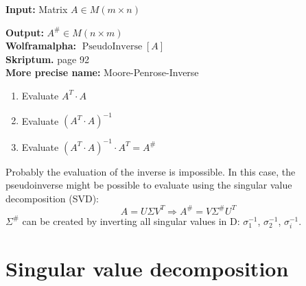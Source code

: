 \documentclass[a4paper,twocolumn]{article}
\newcommand{\io}[2]{{\par\noindent\textbf{Input:} #1 \\}{\textbf{Output:} #2 \\}}
\newcommand{\wa}[1]{\textbf{Wolframalpha:} $#1$ \\}
\newcommand{\scriptref}[1]{\textbf{Skriptum.} page #1 \\}
\begin{document}
\io{Matrix $A \in M(m\times n)$}{$A^{\#} \in M(n\times m)$}
\wa{\operatorname{PseudoInverse}[A]}
\scriptref{92}
\textbf{More precise name:} Moore-Penrose-Inverse

\begin{enumerate}
    \item Evaluate $A^T\cdot A$
    \item Evaluate $(A^T\cdot A)^{-1}$
    \item Evaluate $(A^T\cdot A)^{-1} \cdot A^T = A^\#$
\end{enumerate}
%
Probably the evaluation of the inverse is impossible. In this case,
the pseudoinverse might be possible to evaluate using the singular
value decomposition (SVD):
\[
    A = U\Sigma V^T
        \Rightarrow A^\# = V\Sigma^\# U^T
\]
%
$\Sigma^\#$ can be created by inverting all singular values
in D: $\sigma_1^{-1}$, $\sigma_2^{-1}$, $\sigma_i^{-1}$.

\section{Singular value decomposition}
\end{document}
